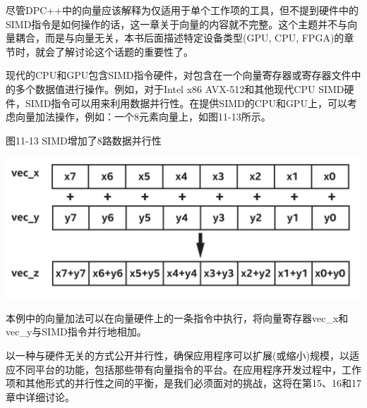 尽管DPC++中的向量应该解释为仅适用于单个工作项的工具，但不提到硬件中的SIMD指令是如何操作的话，这一章关于向量的内容就不完整。这个主题并不与向量耦合，而是与向量无关，本书后面描述特定设备类型(GPU, CPU, FPGA)的章节时，就会了解讨论这个话题的重要性了。\par

现代的CPU和GPU包含SIMD指令硬件，对包含在一个向量寄存器或寄存器文件中的多个数据值进行操作。例如，对于Intel x86 AVX-512和其他现代CPU SIMD硬件，SIMD指令可以用来利用数据并行性。在提供SIMD的CPU和GPU上，可以考虑向量加法操作，例如：一个8元素向量上，如图11-13所示。\par

\hspace*{\fill} \par %
图11-13 SIMD增加了8路数据并行性
\begin{center}
	\includegraphics[width=1.0\textwidth]{content/chapter-11/images/2}
\end{center}

本例中的向量加法可以在向量硬件上的一条指令中执行，将向量寄存器vec\_x和vec\_y与SIMD指令并行地相加。\par

以一种与硬件无关的方式公开并行性，确保应用程序可以扩展(或缩小)规模，以适应不同平台的功能，包括那些带有向量指令的平台。在应用程序开发过程中，工作项和其他形式的并行性之间的平衡，是我们必须面对的挑战，这将在第15、16和17章中详细讨论。\par













